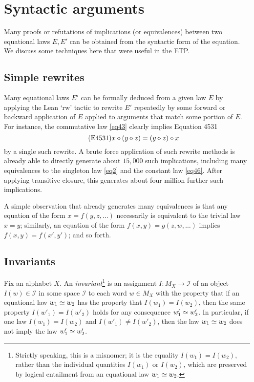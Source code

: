 
\section{Syntactic arguments}\label{syntactic-sec}

Many proofs or refutations of implications (or equivalences) between two equational laws $E,E'$ can be obtained from the syntactic form of the equation.  We discuss some techniques here that were useful in the ETP.

\subsection{Simple rewrites}\label{rewrite-sec}

Many equational laws $E'$ can be formally deduced from a given law $E$ by applying the Lean `rw' tactic to rewrite $E'$ repeatedly by some forward or backward application of $E$ applied to arguments that match some portion of $E$.  For instance, the commutative law \eqref{eq43} clearly implies Equation 4531
\begin{equation}\label{eq4531}\tag{E4531}
    x \diamond (y \diamond z) = (y \diamond z) \diamond x
\end{equation}
by a single such rewrite.  A brute force application of such rewrite methods is already able to directly generate about $15,000$ such implications, including many equivalences to the singleton law \eqref{eq2} and the constant law \eqref{eq46}.  After applying transitive closure, this generates about four million further such implications.

A simple observation that already generates many equivalences is that any equation of the form $x = f(y,z,\dots)$ necessarily is equivalent to the trivial law $x = y$; similarly, an equation of the form $f(x,y) = g(z,w,\dots)$ implies $f(x,y) = f(x',y')$; and so forth.

\subsection{Invariants}

Fix an alphabet $X$. An \emph{invariant}\footnote{Strictly speaking, this is a misnomer; it is the equality $I(w_1) = I(w_2)$, rather than the individual quantities $I(w_1)$ or $I(w_2)$, which are preserved by logical entailment from an equational law $w_1 \simeq w_2$.} is an assignment $I \colon M_X \to {\mathcal I}$ of an object $I(w) \in {\mathcal I}$ in some space ${\mathcal I}$ to each word $w \in M_X$ with the property that if an equational law $w_1 \simeq w_2$ has the property that $I(w_1)=I(w_2)$, then the same property $I(w'_1) = I(w'_2)$ holds for any consequence $w'_1 \simeq w'_2$.  In particular, if one law $I(w_1)=I(w_2)$ and $I(w'_1) \neq I(w'_2)$, then the law $w_1 \simeq w_2$ does not imply the law $w'_1 \simeq w'_2$.

